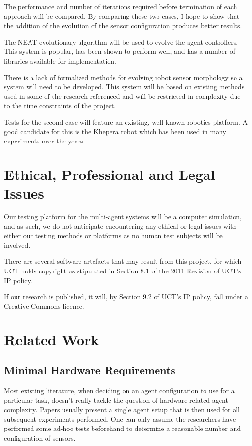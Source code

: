 \documentclass[a4paper,12pt]{article}
\begin{document}
The performance and number of iterations required before termination of each approach will be compared. By comparing these two cases, I hope to show that the addition of the evolution of the sensor configuration produces better results.

The NEAT evolutionary algorithm will be used to evolve the agent controllers.\cite{Stanley02} This system is popular, has been shown to perform well, and has a number of libraries available for implementation.

There is a lack of formalized methods for evolving robot sensor morphology so a system will need to be developed. This system will be based on existing methods used in some of the research referenced and will be restricted in complexity due to the time constraints of the project.

Tests for the second case will feature an existing, well-known robotics platform. A good candidate for this is the Khepera robot which has been used in many experiments over the years.

\section{Ethical, Professional and Legal Issues}

Our testing platform for the multi-agent systems will be a computer simulation, and as such, we do not anticipate encountering any ethical or legal issues with either our testing methods or platforms as no human test subjects will be involved.

There are several software artefacts that may result from this project, for which UCT holds copyright as stipulated in Section 8.1 of the 2011 Revision of UCT’s IP policy\cite{UCTIP}.

If our research is published, it will, by Section 9.2 of UCT’s IP policy, fall under a Creative Commons licence\cite{UCTIP}.


\section{Related Work}

\subsection{Minimal Hardware Requirements}
Most existing literature, when deciding on an agent configuration to use for a particular task, doesn’t really tackle the question of hardware-related agent complexity. Papers usually present a single agent setup that is then used for all subsequent experiments performed\cite{Waibel09, Sims94}. One can only assume the researchers have performed some ad-hoc tests beforehand to determine a reasonable number and configuration of sensors.
\end{document}
